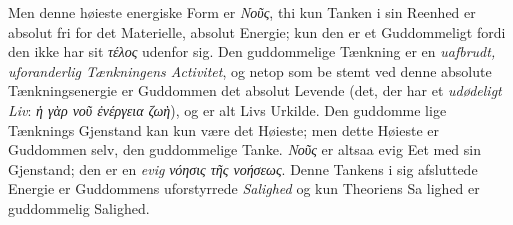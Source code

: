 \documentclass[12pt,a4paper]{book}
\newcommand{\gk}[1]{\textit{#1}}
\begin{document}
Men denne høieste energiske Form er \gk{Νοῦς}, thi kun Tanken
i sin Reenhed er absolut fri for det Materielle, absolut Energie;
kun den er et Guddommeligt fordi den ikke har sit \gk{τέλος}
udenfor sig. Den guddommelige Tænkning er en \emph{uafbrudt,
uforanderlig Tænkningens Activitet}, og netop som be\-%
stemt ved denne absolute Tænkningsenergie er Guddommen
det absolut Levende (det, der har et \emph{udødeligt Liv}: \gk{ἡ γὰρ
νοῦ ἐνέργεια ζωὴ}), og er alt Livs Urkilde. Den guddomme\-%
lige Tænknings Gjenstand kan kun være det Høieste; men
dette Høieste er Guddommen selv, den guddommelige Tanke.
\gk{Νοῦς} er altsaa evig Eet med sin Gjenstand; den er en \emph{evig}
\gk{νόησις τῆς νοήσεως}. Denne Tankens i sig afsluttede Energie
er Guddommens uforstyrrede \emph{Salighed} og kun Theoriens Sa\-%
lighed er guddommelig Salighed.
\end{document}
